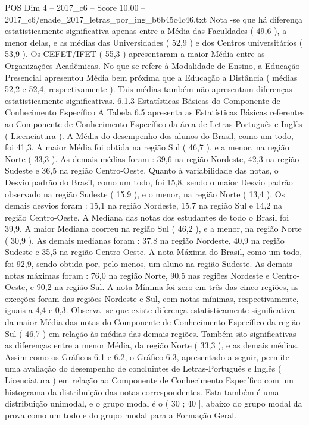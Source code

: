 \begin{textsample}{POS Dim 4 – 2017\_c6 – Score 10.00 – 2017\_c6/enade\_2017\_letras\_por\_ing\_b6b45c4c46.txt}
Nota -se que há diferença estatisticamente significativa apenas entre a Média das Faculdades ( 49,6 ), a menor delas, e as médias das Universidades ( 52,9 ) e dos Centros universitários ( 53,9 ).
Os CEFET/IFET ( 55,3 ) apresentaram a maior Média entre as Organizações Acadêmicas.
No que se refere à Modalidade de Ensino, a Educação Presencial apresentou Média bem próxima que a Educação a Distância ( médias 52,2 e 52,4, respectivamente ).
Tais médias também não apresentam diferenças estatisticamente significativas. 6.1.3 Estatísticas Básicas do Componente de Conhecimento Específico A Tabela 6.5 apresenta as Estatísticas Básicas referentes ao Componente de Conhecimento Específico da área de Letras-Português e Inglês ( Licenciatura ).
A Média do desempenho dos alunos do Brasil, como um todo, foi 41,3.
A maior Média foi obtida na região Sul ( 46,7 ), e a menor, na região Norte ( 33,3 ).
As demais médias foram : 39,6 na região Nordeste, 42,3 na região Sudeste e 36,5 na região Centro-Oeste.
Quanto à variabilidade das notas, o Desvio padrão do Brasil, como um todo, foi 15,8, sendo o maior Desvio padrão observado na região Sudeste ( 15,9 ), e o menor, na região Norte ( 13,4 ).
Os demais desvios foram : 15,1 na região Nordeste, 15,7 na região Sul e 14,2 na região Centro-Oeste.
A Mediana das notas dos estudantes de todo o Brasil foi 39,9.
A maior Mediana ocorreu na região Sul ( 46,2 ), e a menor, na região Norte ( 30,9 ).
As demais medianas foram : 37,8 na região Nordeste, 40,9 na região Sudeste e 35,5 na região Centro-Oeste.
A nota Máxima do Brasil, como um todo, foi 92,9, sendo obtida por, pelo menos, um aluno na região Sudeste.
As demais notas máximas foram : 76,0 na região Norte, 90,5 nas regiões Nordeste e Centro-Oeste, e 90,2 na região Sul.
A nota Mínima foi zero em três das cinco regiões, as exceções foram das regiões Nordeste e Sul, com notas mínimas, respectivamente, iguais a 4,4 e 0,3.
Observa -se que existe diferença estatisticamente significativa da maior Média das notas do Componente de Conhecimento Específico da região Sul ( 46,7 ) em relação às médias das demais regiões.
Também são significativas as diferenças entre a menor Média, da região Norte ( 33,3 ), e as demais médias.
Assim como os Gráficos 6.1 e 6.2, o Gráfico 6.3, apresentado a seguir, permite uma avaliação do desempenho de concluintes de Letras-Português e Inglês ( Licenciatura ) em relação ao Componente de Conhecimento Específico com um histograma da distribuição das notas correspondentes.
Esta também é uma distribuição unimodal, e o grupo modal é o ( 30 ; 40 ], abaixo do grupo modal da prova como um todo e do grupo modal para a Formação Geral.

\end{textsample}
